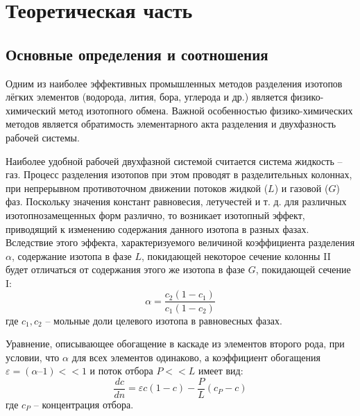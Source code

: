 \section{Теоретическая часть}
\subsection{Основные определения и соотношения}
Одним из наиболее эффективных промышленных методов разделения изотопов 
лёгких элементов (водорода, лития, бора, углерода и др.) является 
физико-химический метод изотопного обмена. Важной особенностью 
физико-химических методов является обратимость элементарного акта разделения 
и двухфазность рабочей системы.

Наиболее удобной рабочей двухфазной системой считается система 
жидкость – газ. Процесс разделения изотопов при этом проводят в 
разделительных колоннах, при непрерывном противоточном движении потоков 
жидкой ($L$) и газовой ($G$) фаз. Поскольку значения констант равновесия, 
летучестей и т. д. для различных изотопнозамещенных форм различно, 
то возникает изотопный эффект, приводящий к изменению содержания данного 
изотопа в разных фазах. Вследствие этого эффекта, характеризуемого величиной 
коэффициента разделения $\alpha$, содержание изотопа в фазе $L$, покидающей 
некоторое сечение колонны II будет отличаться от содержания этого же изотопа 
в фазе $G$, покидающей сечение I:
\begin{equation}
\alpha = \dfrac{c_{2}(1-c_{1})}{c_{1}(1-c_{2})}
\end{equation}
\noindent где $c_{1}, c_{2}$ – мольные доли целевого изотопа в равновесных фазах.

Уравнение, описывающее обогащение в каскаде из элементов второго рода, 
при условии, что $\alpha$ для всех элементов одинаково, а коэффициент 
обогащения $\varepsilon = (\alpha – 1) << 1$ и поток отбора $P << L$ 
имеет вид:
\begin{equation}
\dfrac{dc}{dn} = \varepsilon c(1-c) - \dfrac{P}{L}(c_{P}-c)
\end{equation}
\noindent где $c_{P}$ – концентрация отбора.

